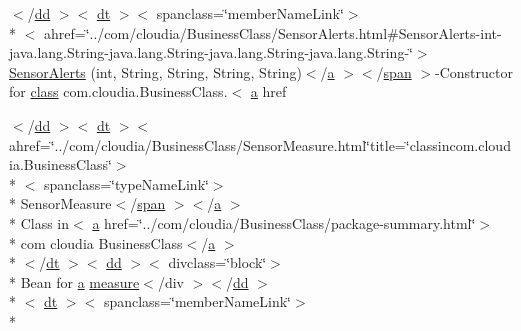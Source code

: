 \begin{DoxyCompactItemize}
\item 
$<$/\hyperlink{stylesheet_8css_a47f4718a86835a7771ec592ece845221}{dd} $>$$<$ \hyperlink{stylesheet_8css_a107565fb4039d33b041380d6e0ea1d80}{dt} $>$$<$ spanclass=\char`\"{}member\-Name\-Link\char`\"{}$>$\\*
$<$ ahref=\char`\"{}../com/cloudia/Business\-Class/Sensor\-Alerts.\-html\#Sensor\-Alerts-\/int-\/java.\-lang.\-String-\/java.\-lang.\-String-\/java.\-lang.\-String-\/java.\-lang.\-String-\/\char`\"{}$>$ \hyperlink{index-17_8html_a3dfa5a326398cca33466fb1c8e9f75b6}{Sensor\-Alerts} (int, String, String, String, String)$<$/\hyperlink{style_8css_a5e8981582017bb8b84c21f148345d1f7}{a} $>$$<$/\hyperlink{stylesheet_8css_a8343996ebcf16220b04e54659aac31cc}{span} $>$-\/Constructor for \hyperlink{_tools_8html_acf06f836132665ba8114f5a414c2403f}{class} com.\-cloudia.\-Business\-Class.$<$ \hyperlink{style_8css_a5e8981582017bb8b84c21f148345d1f7}{a} href
\item 
$<$/\hyperlink{stylesheet_8css_a47f4718a86835a7771ec592ece845221}{dd} $>$$<$ \hyperlink{stylesheet_8css_a107565fb4039d33b041380d6e0ea1d80}{dt} $>$$<$ ahref=\char`\"{}../com/cloudia/Business\-Class/Sensor\-Measure.\-html\char`\"{}title=\char`\"{}classincom.\-cloudia.\-Business\-Class\char`\"{}$>$\\*
$<$ spanclass=\char`\"{}type\-Name\-Link\char`\"{}$>$\\*
 Sensor\-Measure$<$/\hyperlink{stylesheet_8css_a8343996ebcf16220b04e54659aac31cc}{span} $>$$<$/\hyperlink{style_8css_a5e8981582017bb8b84c21f148345d1f7}{a} $>$\\*
 Class in$<$ \hyperlink{style_8css_a5e8981582017bb8b84c21f148345d1f7}{a} href=\char`\"{}../com/cloudia/Business\-Class/package-\/summary.\-html\char`\"{}$>$\\*
 com cloudia Business\-Class$<$/\hyperlink{style_8css_a5e8981582017bb8b84c21f148345d1f7}{a} $>$\\*
$<$/\hyperlink{stylesheet_8css_a107565fb4039d33b041380d6e0ea1d80}{dt} $>$$<$ \hyperlink{stylesheet_8css_a47f4718a86835a7771ec592ece845221}{dd} $>$$<$ divclass=\char`\"{}block\char`\"{}$>$\\*
 Bean for \hyperlink{style_8css_a5e8981582017bb8b84c21f148345d1f7}{a} \hyperlink{index-11_8html_acafc813e7e06597a079f86f5cdd7d5f9}{measure}$<$/div $>$$<$/\hyperlink{stylesheet_8css_a47f4718a86835a7771ec592ece845221}{dd} $>$\\*
$<$ \hyperlink{stylesheet_8css_a107565fb4039d33b041380d6e0ea1d80}{dt} $>$$<$ spanclass=\char`\"{}member\-Name\-Link\char`\"{}$>$\\*

\end{DoxyCompactItemize}
